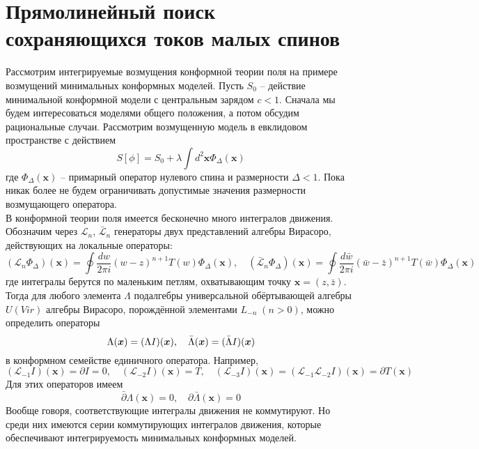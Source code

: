 \documentclass[12pt]{article}
\theoremstyle{definition}
\begin{document}
\section{Прямолинейный поиск сохраняющихся токов малых спинов}
Рассмотрим интегрируемые возмущения конформной теории поля на примере возмущений минимальных конформных моделей. Пусть $S_0$ -- действие минимальной конформной модели с центральным зарядом $c < 1$. Сначала мы будем интересоваться моделями общего положения, а потом обсудим рациональные случаи. Рассмотрим возмущенную модель в евклидовом пространстве с действием
\begin{equation}
    S[\phi]=S_0+\lambda\int d^2\bm{x}\Phi_\Delta(\bm{x})
\end{equation}
где $\Phi_\Delta(\bm{x})$ -- примарный оператор нулевого спина и размерности $\Delta < 1$. Пока никак более не будем ограничивать допустимые значения размерности возмущающего оператора.\\
В конформной теории поля имеется бесконечно много интегралов движения. Обозначим через $\mathcal{L}_n$, $\bar{\mathcal{L}}_n$ генераторы двух представлений алгебры Вирасоро, действующих на локальные операторы:
\begin{equation}
    (\mathcal{L}_n\Phi_\Delta)(\bm{x})=\oint\frac{dw}{2\pi i}(w-z)^{n+1}T(w)\Phi_\Delta(\bm{x}),\quad(\bar{\mathcal{L}}_n\Phi_\Delta)(\bm{x})=\oint\frac{d\bar{w}}{2\pi i}(\bar{w}-\bar{z})^{n+1}T(\bar{w})\Phi_\Delta(\bm{x})
\end{equation}
где интегралы берутся по маленьким петлям, охватывающим точку $\bm{x}=(z,\bar{z})$. Тогда для любого элемента $\Lambda$ подалгебры универсальной обёртывающей алгебры $U(Vir)$ алгебры Вирасоро, порождённой элементами $L_{-n}\; (n > 0)$, можно определить операторы
\begin{equation}
    \Lambda(\bm{x})=(\Lambda I)(\bm{x}),\quad\Bar{\Lambda}(\bm{x})=(\Bar{\Lambda}I)(\bm{x})
\end{equation}
в конформном семействе единичного оператора. Например,
\begin{equation}
    (\mathcal{L}_{-1}I)(\bm{x})=\partial I=0,\quad(\mathcal{L}_{-2}I)(\bm{x})=T,\quad (\mathcal{L}_{-3}I)(\bm{x})=(\mathcal{L}_{-1}\mathcal{L}_{-2}I)(\bm{x})=\partial T(\bm{x})
\end{equation}
Для этих операторов имеем
\begin{equation}\label{eq3}
    \bar{\partial}\Lambda(\bm{x})=0,\quad\partial\bar{\Lambda}(\bm{x})=0
\end{equation}
Вообще говоря, соответствующие интегралы движения не коммутируют. Но среди них имеются серии коммутирующих интегралов движения, которые обеспечивают интегрируемость минимальных конформных моделей.\\
\end{document}
